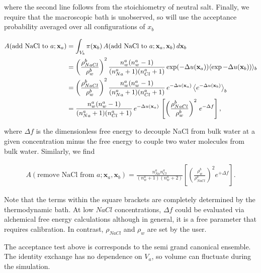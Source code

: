 \documentclass[11pt]{article} %
\begin{document}
where the second line follows from the stoichiometry of neutral salt. Finally, we require that the macroscopic bath is unobserved, so will use the acceptance probability averaged over all configurations of $x_b$

\begin{align}
A(\text{add NaCl to} \,\, a;\mathbf{x}_a)  &= \int_{V_b} \pi(\mathbf{x}_b)\, A(\text{add NaCl to} \,\, a;\mathbf{x}_a,\mathbf{x}_b) \, d\mathbf{x}_b \notag\\
&= \left(\frac{\rho_{NaCl}^b}{\rho_w^b}\right)^2\frac{n_w^a(n_w^a - 1)}{(n^a_{Na} + 1)(n^a_{Cl} + 1)}\exp(-\Delta u(\mathbf{x}_a))\langle \exp-\Delta u(\mathbf{x}_b)) \rangle_b \notag\\
&= \left(\frac{\rho_{NaCl}^b}{\rho_w^b}\right)^2\frac{n_w^a(n_w^a - 1)}{(n^a_{Na} + 1)(n^a_{Cl} + 1)} \, e^{-\Delta u(\mathbf{x}_a)}\,\big\langle e^{-\Delta u(\mathbf{x}_b)} \big\rangle_b \notag\\ 
&= \frac{n_w^a(n_w^a - 1)}{(n^a_{Na} + 1)(n^a_{Cl} + 1)} \, e^{-\Delta u(\mathbf{x}_a)} \, \left[ \left(\frac{\rho^b_{NaCl}}{\rho_w^b}\right)^2 \, e^{-\Delta f} \right],
\end{align}

where $\Delta f$ is the dimensionless free energy to decouple NaCl from bulk water at a given concentration minus the free energy to couple two water molecules from bulk water. Similarly, we find

\begin{align}
A(\text{remove NaCl from} \,\, a;\mathbf{x}_a,\mathbf{x}_b) = \frac{n_{Na}^a n_{Cl}^a}{(n_{w}^a+1)(n_{w}^a+2)}  \left [\left(\frac{\rho_{w}^b}{\rho_{NaCl}^b}\right)^2e^{+\Delta f} \right].
\end{align}

Note that the terms within the square brackets are completely determined by the thermodynamic bath. At low $NaCl$ concentrations, $\Delta f$ could be evaluated via alchemical free energy calculations although in general, it is a free parameter that requires calibration. In contrast, $\rho_{NaCl}$ and $\rho_{w}$ are set by the user. 

The acceptance test above is corresponds to the semi grand canonical ensemble. The identity exchange has no dependence on $V_a$, so volume can fluctuate during the simulation.
\end{document}
